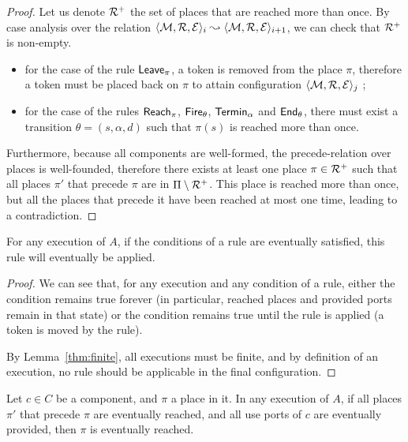 {{\begin{proof}
    Let us denote $\mathcal{R}^+$ the set of places that are reached more
    than once. By case analysis over the relation $\langle \mathcal{M},
    \mathcal{R}, \mathcal{E} \rangle_i \leadsto \langle \mathcal{M}, \mathcal{R}, \mathcal{E}
    \rangle_{i+1}$, we can check that $\mathcal{R}^+$ is non-empty.
    \begin{itemize}
    \item for the case of the rule $\mathsf{Leave}_\pi$, a token is removed
      from the place $\pi$, therefore a token must be placed back on
      $\pi$ to attain configuration $\langle \mathcal{M}, \mathcal{R}, \mathcal{E}
      \rangle_j$ ;
    \item for the case of the rules $\mathsf{Reach}_\pi$, $\mathsf{Fire}_\theta$,
      $\mathsf{Termin}_\alpha$ and $\mathsf{End}_\theta$, there must exist a transition
      $\theta = (s, \alpha, d)$ such that $\pi(s)$ is reached
      more than once.
    \end{itemize}
    Furthermore, because all components are well-formed, the
    precede-relation over places is well-founded, therefore there
    exists at least one place $\pi \in \mathcal{R}^+$ such that all
    places $\pi'$ that precede $\pi$ are in $\Pi \setminus
    \mathcal{R}^+$. This place is reached more than once, but all the
    places that precede it have been reached at most one time, leading
    to a contradiction.
  \end{proof}

  \begin{lemma}\label{thm:applyrules}
    For any execution of $A$, if the conditions of a rule are
    eventually satisfied, this rule will eventually be applied.
  \end{lemma}

  \begin{proof}
    We can see that, for any execution and any condition of a rule,
    either the condition remains true forever (in particular, reached
    places and provided ports remain in that state) or the condition
    remains true until the rule is applied (\eg a token is moved by
    the rule).

    By Lemma~\ref{thm:finite}, all executions must be finite, and by
    definition of an execution, no rule should be applicable in the
    final configuration.
  \end{proof}

  \begin{lemma}\label{thm:reachedplaces}
    Let $c \in C$ be a component, and $\pi$ a place in it. In any
    execution of $A$, if all places $\pi'$ that precede $\pi$ are
    eventually reached, and all use ports of $c$ are eventually
    provided, then $\pi$ is eventually reached.
  \end{lemma}

}}
